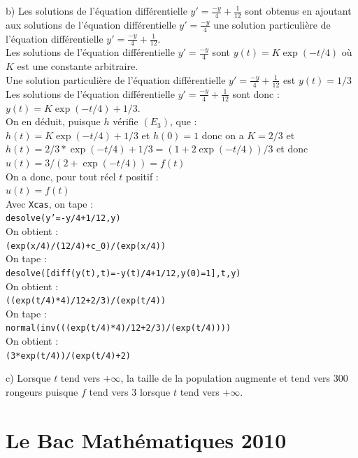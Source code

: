\documentclass[a4paper,11pt]{book}
\begin{document}
b) Les solutions  de l'\'equation diff\'erentielle 
$\displaystyle y'=\frac{-y}{4}+\frac{1}{12}$ sont obtenus en ajoutant aux 
solutions  de l'\'equation diff\'erentielle 
$\displaystyle y'=\frac{-y}{4}$ une solution particuli\`ere de l'\'equation 
diff\'erentielle $\displaystyle y'=\frac{-y}{4}+\frac{1}{12}$.\\
 Les solutions  de l'\'equation diff\'erentielle 
$\displaystyle y'=\frac{-y}{4}$ sont $y(t)=K\exp(-t/4)$ o\`u $K$ est une 
constante arbitraire.\\
Une solution particuli\`ere de l'\'equation 
diff\'erentielle $\displaystyle y'=\frac{-y}{4}+\frac{1}{12}$ est $y(t)=1/3$
Les solutions  de l'\'equation diff\'erentielle 
$\displaystyle y'=\frac{-y}{4}+\frac{1}{12}$ sont donc :\\
$y(t)=K\exp(-t/4)+1/3$.\\
On en d\'eduit, puisque $h$ v\'erifie $(E_3)$, que :\\
$h(t)= K\exp(-t/4)+1/3$ et $h(0)=1$ donc on a $K=2/3$ et \\
$h(t)= 2/3*\exp(-t/4)+1/3=(1+2\exp(-t/4))/3$ et donc\\
$u(t)=3/(2+\exp(-t/4))=f(t)$\\
On a donc, pour tout r\'eel $t$ positif :\\
$u(t)=f(t)$\\
Avec {\tt Xcas}, on tape :\\
{\tt desolve(y'=-y/4+1/12,y)}\\
On obtient :\\
{\tt (exp(x/4)/(12/4)+c\_0)/(exp(x/4))}\\
On tape :\\
{\tt desolve([diff(y(t),t)=-y(t)/4+1/12,y(0)=1],t,y)}\\
On obtient :\\
{\tt ((exp(t/4)*4)/12+2/3)/(exp(t/4))}\\
On tape :\\
{\tt normal(inv(((exp(t/4)*4)/12+2/3)/(exp(t/4))))}\\
On obtient :\\
{\tt (3*exp(t/4))/(exp(t/4)+2)}

c) Lorsque $t$ tend vers $+\infty$, la taille de la population augmente et 
tend vers 300 rongeurs puisque $f$ tend vers 3 lorsque $t$ tend vers $+\infty$.

\chapter{Le Bac  Math\'ematiques 2010}
\end{document}
